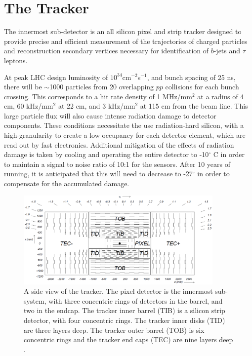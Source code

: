 \section{The Tracker}
\label{tracker_description}

\par The innermost sub-detector is an all silicon pixel and strip
tracker designed to provide precise and efficient measurement of the
trajectories of charged particles and reconstruction secondary
vertices necessary for identification of $b$-jets and $\tau$ leptons.  

\par At peak LHC design luminosity of $10^{34}$cm$^{-2}$s$^{-1}$, and bunch
spacing of 25 ns, there will be $\sim$1000 particles from 20
overlapping $pp$ collisions for each bunch crossing.  This corresponds
to a hit rate density of 1 MHz/mm$^{2}$ at a radius of 4 cm, 60
kHz/mm$^{2}$ at 22 cm, and 3 kHz/mm$^{2}$ at 115 cm from the beam
line.  This large particle flux will also cause intense radiation
damage to detector components.  These conditions necessitate the use
radiation-hard silicon, with a high-granularity to create a low
occupancy for each detector element, which are read out by fast
electronics. Additional mitigation of the effects of radiation damage
is taken by cooling and operating the entire detector to -10$^{\circ}$
C in order to maintain a signal to noise ratio of 10:1 for the
sensors.  After 10 years of running, it is anticipated that this will
need to decrease to -27$^{\circ}$ in order to compensate for the
accumulated damage.    

\begin{figure}[h]
   \centering
  \includegraphics[width=0.9\textwidth]{Figures/CMS_Diagrams/Tracker__Side_View.png}
  \caption{A side view of the tracker.  The pixel detector is the
    innermost sub-system, with three concentric rings of detectors in
    the barrel, and two in the endcap.  The tracker inner barrel (TIB)
  is a silicon strip detector, with four concentric rings.  The
  tracker inner disks (TID) are three layers deep.  The tracker outer
  barrel (TOB) is six concentric rings and the tracker end caps (TEC)
  are nine layers deep \cite{CMS:CMS_Machine_Chatrchyan:2008aa}. } \label{fig:tracker_side}
\end{figure}

